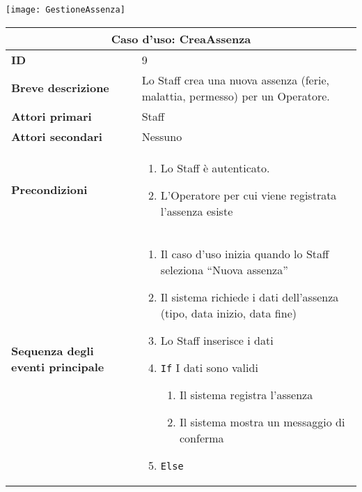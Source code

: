 \documentclass[a4paper]{report}
\begin{document}
\begin{figure*}[ht]
    \centering
    \texttt{[image: GestioneAssenza]}
\end{figure*}

\clearpage
\renewcommand{\arraystretch}{1.9}
\begin{table}[H]
\vspace*{-0cm}
\begin{tabular}{|p{3.9cm}|p{9.9cm}|}
\hline
\multicolumn{2}{|c|}{\textbf{Caso d’uso: CreaAssenza}} \\ \hline
\textbf{ID} & 9 \\ \hline
\textbf{Breve descrizione} & Lo Staff crea una nuova assenza (ferie, malattia, permesso) per un Operatore. \\ \hline
\textbf{Attori primari} & Staff \\ \hline
\textbf{Attori secondari} & Nessuno \\ \hline
\textbf{Precondizioni} & \begin{enumerate}[leftmargin=14pt,label=\arabic*.,labelsep=0.5em,topsep=0pt,partopsep=0pt,parsep=0pt,itemsep=0pt]
    \item Lo Staff è autenticato.
    \item L’Operatore per cui viene registrata l’assenza esiste
\end{enumerate} \\ \hline
\textbf{Sequenza degli eventi principale} & \begin{enumerate}[leftmargin=14pt,label=\arabic*.,labelsep=0.5em,topsep=0pt,partopsep=0pt,parsep=0pt,itemsep=0pt]
    \item Il caso d’uso inizia quando lo Staff seleziona “Nuova assenza”
    \item Il sistema richiede i dati dell’assenza (tipo, data inizio, data fine)
    \item Lo Staff inserisce i dati
    \item \texttt{If} I dati sono validi
    \begin{enumerate}[label=\arabic{enumi}.\arabic*.,leftmargin=22pt,labelsep=0.5em,topsep=0pt,partopsep=0pt,parsep=0pt,itemsep=0pt]
        \item Il sistema registra l’assenza
        \item Il sistema mostra un messaggio di conferma
    \end{enumerate}
    \item \texttt{Else}
    \begin{enumerate}[label=\arabic{enumi}.\arabic*.,leftmargin=22pt,labelsep=0.5em,topsep=0pt,partopsep=0pt,parsep=0pt,itemsep=0pt]

\end{enumerate}
\end{enumerate}
\end{tabular}
\end{table}
\end{document}
